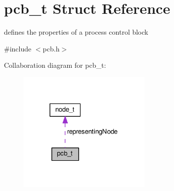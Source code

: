 \hypertarget{structs__pcb__stuct}{}\section{pcb\+\_\+t Struct Reference}
\label{structs__pcb__stuct}


defines the properties of a process control block  




{\ttfamily \#include $<$pcb.\+h$>$}



Collaboration diagram for pcb\+\_\+t\+:\nopagebreak
\begin{figure}[H]
\begin{center}
\leavevmode
\includegraphics[width=183pt]{structs__pcb__stuct__coll__graph}
\end{center}
\end{figure}

